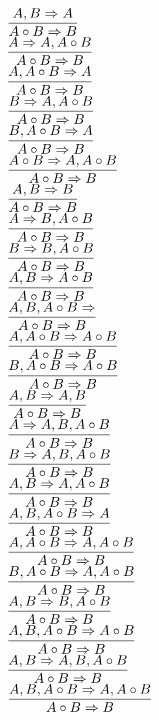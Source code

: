 \documentclass[11pt]{article}
\begin{document}
\begin{center}
\bigskip
\\$\infer{A\circ B\Rightarrow B}{A, B\Rightarrow A}$
\bigskip
\\$\infer{A\circ B\Rightarrow B}{A\Rightarrow A, A\circ B}$
\bigskip
\\$\infer{A\circ B\Rightarrow B}{A, A\circ B\Rightarrow A}$
\bigskip
\\$\infer{A\circ B\Rightarrow B}{B\Rightarrow A, A\circ B}$
\bigskip
\\$\infer{A\circ B\Rightarrow B}{B, A\circ B\Rightarrow A}$
\bigskip
\\$\infer{A\circ B\Rightarrow B}{A\circ B\Rightarrow A, A\circ B}$
\bigskip
\\$\infer{A\circ B\Rightarrow B}{A, B\Rightarrow B}$
\bigskip
\\$\infer{A\circ B\Rightarrow B}{A\Rightarrow B, A\circ B}$
\bigskip
\\$\infer{A\circ B\Rightarrow B}{B\Rightarrow B, A\circ B}$
\bigskip
\\$\infer{A\circ B\Rightarrow B}{A, B\Rightarrow A\circ B}$
\bigskip
\\$\infer{A\circ B\Rightarrow B}{A, B, A\circ B\Rightarrow }$
\bigskip
\\$\infer{A\circ B\Rightarrow B}{A, A\circ B\Rightarrow A\circ B}$
\bigskip
\\$\infer{A\circ B\Rightarrow B}{B, A\circ B\Rightarrow A\circ B}$
\bigskip
\\$\infer{A\circ B\Rightarrow B}{A, B\Rightarrow A, B}$
\bigskip
\\$\infer{A\circ B\Rightarrow B}{A\Rightarrow A, B, A\circ B}$
\bigskip
\\$\infer{A\circ B\Rightarrow B}{B\Rightarrow A, B, A\circ B}$
\bigskip
\\$\infer{A\circ B\Rightarrow B}{A, B\Rightarrow A, A\circ B}$
\bigskip
\\$\infer{A\circ B\Rightarrow B}{A, B, A\circ B\Rightarrow A}$
\bigskip
\\$\infer{A\circ B\Rightarrow B}{A, A\circ B\Rightarrow A, A\circ B}$
\bigskip
\\$\infer{A\circ B\Rightarrow B}{B, A\circ B\Rightarrow A, A\circ B}$
\bigskip
\\$\infer{A\circ B\Rightarrow B}{A, B\Rightarrow B, A\circ B}$
\bigskip
\\$\infer{A\circ B\Rightarrow B}{A, B, A\circ B\Rightarrow A\circ B}$
\bigskip
\\$\infer{A\circ B\Rightarrow B}{A, B\Rightarrow A, B, A\circ B}$
\bigskip
\\$\infer{A\circ B\Rightarrow B}{A, B, A\circ B\Rightarrow A, A\circ B}$

\end{center}
\end{document}
